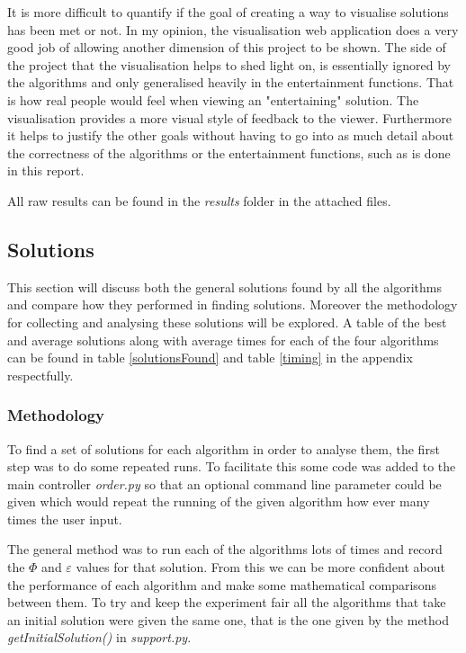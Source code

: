 \documentclass[12pt]{report}
\begin{document}
It is more difficult to quantify if the goal of creating a way to visualise solutions has been met or not. In my opinion, the visualisation web application does a very good job of allowing another dimension of this project to be shown. The side of the project that the visualisation helps to shed light on, is essentially ignored by the algorithms and only generalised heavily in the entertainment functions. That is how real people would feel when viewing an "entertaining" solution. The visualisation provides a more visual style of feedback to the viewer. Furthermore it helps to justify the other goals without having to go into as much detail about the correctness of the algorithms or the entertainment functions, such as is done in this report.

All raw results can be found in the \textit{results} folder in the attached files.

\subsection{Solutions}\label{solutions}
This section will discuss both the general solutions found by all the algorithms and compare how they performed in finding solutions. Moreover the methodology for collecting and analysing these solutions will be explored. A table of the best and average solutions along with average times for each of the four algorithms can be found in table \ref{solutionsFound} and table \ref{timing} in the appendix respectfully. 

\subsubsection{Methodology}
To find a set of solutions for each algorithm in order to analyse them, the first step was to do some repeated runs. To facilitate this some code was added to the main controller \textit{order.py} so that an optional command line parameter could be given which would repeat the running of the given algorithm how ever many times the user input. 

The general method was to run each of the algorithms lots of times and record the $\Phi$ and $\varepsilon$ values for that solution. From this we can be more confident about the performance of each algorithm and make some mathematical comparisons between them. To try and keep the experiment fair all the algorithms that take an initial solution were given the same one, that is the one given by the method \textit{getInitialSolution()} in \textit{support.py}.
\end{document}
